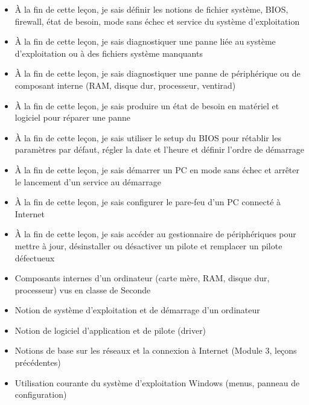 \documentclass[11pt]{article}
\begin{document}
\begin{objectifs}
\begin{itemize}
\item À la fin de cette leçon, je sais définir les notions de fichier système, BIOS, firewall, état de besoin, mode sans échec et service du système d'exploitation
\item À la fin de cette leçon, je sais diagnostiquer une panne liée au système d'exploitation ou à des fichiers système manquants
\item À la fin de cette leçon, je sais diagnostiquer une panne de périphérique ou de composant interne (RAM, disque dur, processeur, ventirad)
\item À la fin de cette leçon, je sais produire un état de besoin en matériel et logiciel pour réparer une panne
\item À la fin de cette leçon, je sais utiliser le setup du BIOS pour rétablir les paramètres par défaut, régler la date et l'heure et définir l'ordre de démarrage
\item À la fin de cette leçon, je sais démarrer un PC en mode sans échec et arrêter le lancement d'un service au démarrage
\item À la fin de cette leçon, je sais configurer le pare-feu d'un PC connecté à Internet
\item À la fin de cette leçon, je sais accéder au gestionnaire de périphériques pour mettre à jour, désinstaller ou désactiver un pilote et remplacer un pilote défectueux
\end{itemize}
\end{objectifs}

\begin{prerequis}
\begin{itemize}
\item Composants internes d'un ordinateur (carte mère, RAM, disque dur, processeur) vus en classe de Seconde
\item Notion de système d'exploitation et de démarrage d'un ordinateur
\item Notion de logiciel d'application et de pilote (driver)
\item Notions de base sur les réseaux et la connexion à Internet (Module 3, leçons précédentes)
\item Utilisation courante du système d'exploitation Windows (menus, panneau de configuration)
\end{itemize}
\end{prerequis}

\newpage
\end{document}
